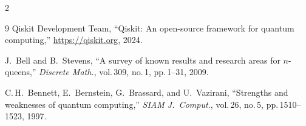 \documentclass[9pt, a4paper]{extarticle}
\begin{document}
\begin{multicols}{2}
\begin{thebibliography}{9}
    Qiskit Development Team,
    ``Qiskit: An open-source framework for quantum computing,''
    \url{https://qiskit.org}, 2024.

    J.~Bell and B.~Stevens,
    ``A survey of known results and research areas for $n$-queens,''
    \textit{Discrete Math.}, vol.\,309, no.\,1, pp.\,1--31, 2009.

    C.\,H.~Bennett, E.~Bernstein, G.~Brassard, and U.~Vazirani,
    ``Strengths and weaknesses of quantum computing,''
    \textit{SIAM J.\ Comput.}, vol.\,26, no.\,5, pp.\,1510--1523, 1997.
\end{thebibliography}

\end{multicols}
\end{document}
